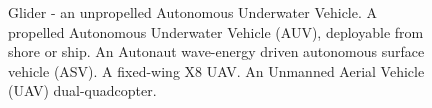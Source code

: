 \documentclass[11pt,letterpaper]{article}
\begin{document}
\begin{figure}[!b]
\centering
\vspace{-0.3in}
\caption{  Glider - an unpropelled Autonomous
  Underwater Vehicle.   A propelled Autonomous
  Underwater Vehicle (AUV), deployable from shore or ship.
   An Autonaut wave-energy driven autonomous surface
  vehicle (ASV).   A fixed-wing X8 UAV.
   An Unmanned Aerial Vehicle (UAV) dual-quadcopter.}
\label{fig:systems}
\end{figure}
\end{document}
